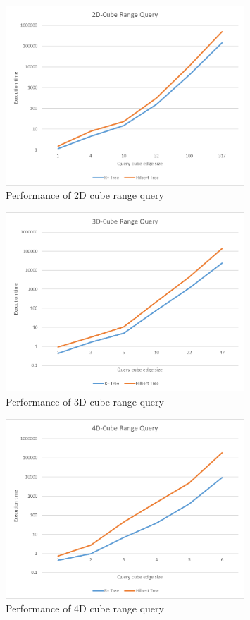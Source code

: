 \documentclass[11pt, a4paper, oneside]{article}
\begin{document}
\begin{enumerate}
\begin{figure}[H]
  \centering
    \includegraphics[width=0.8\textwidth]{img/cube2d}
      \caption{Performance of 2D cube range query  }
  \label{fig:cube2D}
\end{figure}

\begin{figure}[H]
  \centering
    \includegraphics[width=0.8\textwidth]{img/cube3d}
      \caption{Performance of 3D cube range query }
  \label{fig:cube3D}
\end{figure}

\begin{figure}[H]
  \centering
    \includegraphics[width=0.8\textwidth]{img/cube4d}
      \caption{Performance of 4D cube range query  }
  \label{fig:cube4D}
\end{figure}


\end{enumerate}
\end{document}
